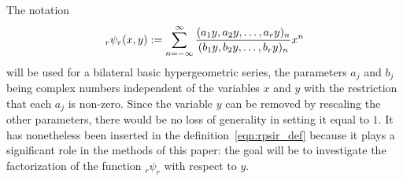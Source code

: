 \documentclass[10pt,a4paper]{amsart}
\numberwithin{equation}{section}
\begin{document}
The notation
\begin{equation} \label{eqn:rpsir_def}
_r\psi_r(x,y) := \sum_{n=-\infty}^\infty {(a_1 y, a_2 y, \dots, a_r y)_n \over (b_1 y, b_2 y, \dots, b_r y)_n} x^n
\end{equation}
will be used for a bilateral basic hypergeometric series, the parameters $a_j$ and $b_j$ being complex numbers independent of the variables $x$ and $y$ with the restriction that each $a_j$ is non-zero. Since the variable $y$ can be removed by rescaling the other parameters, there would be no loss of generality in setting it equal to $1$. It has nonetheless been inserted in the definition~\eqref{eqn:rpsir_def} because it plays a significant role in the methods of this paper: the goal will be to investigate the factorization of the function $_r\psi_r$ with respect to $y$.
\end{document}

